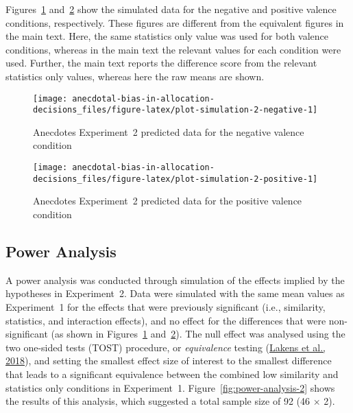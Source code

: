 \documentclass[
  man, donotrepeattitle,floatsintext]{apa7}
\theoremstyle{definition}
\theoremstyle{definition}
\theoremstyle{definition}
\theoremstyle{definition}
\theoremstyle{remark}
\begin{document}
Figures~\ref{fig:plot-simulation-2-negative}
and~\ref{fig:plot-simulation-2-positive} show the simulated data for
the negative and positive valence conditions, respectively. These figures are
different from the equivalent figures in the main text. Here, the same
statistics only value was used for both valence conditions, whereas in the main
text the relevant values for each condition were used. Further, the main text
reports the difference score from the relevant statistics only values, whereas
here the raw means are shown.



\begin{figure}
\texttt{[image: anecdotal-bias-in-allocation-decisions\_files/figure-latex/plot-simulation-2-negative-1]} \caption{Anecdotes Experiment~2 predicted data for the negative valence condition}\label{fig:plot-simulation-2-negative}
\end{figure}



\begin{figure}
\texttt{[image: anecdotal-bias-in-allocation-decisions\_files/figure-latex/plot-simulation-2-positive-1]} \caption{Anecdotes Experiment~2 predicted data for the positive valence condition}\label{fig:plot-simulation-2-positive}
\end{figure}

\hypertarget{power-analysis-2}{%
\subsection{Power Analysis}\label{power-analysis-2}}

A power analysis was conducted through simulation of the effects implied by the
hypotheses in Experiment~2. Data were simulated with the same mean values as
Experiment~1 for the effects that were previously significant (i.e., similarity,
statistics, and interaction effects), and no effect for the differences that
were non-significant (as shown in
Figures~\ref{fig:plot-simulation-2-negative}
and~\ref{fig:plot-simulation-2-positive}). The null effect was
analysed using the two one-sided tests (TOST) procedure, or \emph{equivalence}
testing (\protect\hyperlink{ref-lakens2018}{Lakens et al., 2018}), and setting the smallest effect size of interest to the
smallest difference that leads to a significant equivalence between the combined
low similarity and statistics only conditions in Experiment~1.
Figure~\ref{fig:power-analysis-2} shows the results of this analysis,
which suggested a total sample size of 92
(46 \(\times\) 2).
\end{document}
